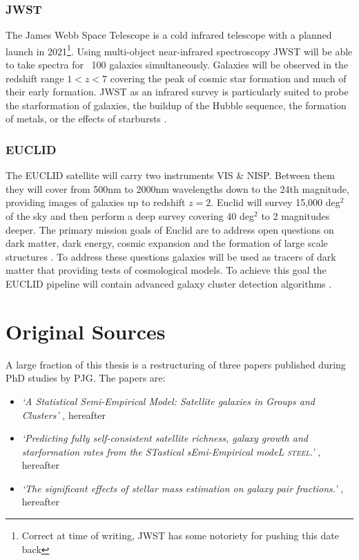 \subsubsection{JWST \cite{JamesNASA}}

The James Webb Space Telescope is a cold infrared telescope with a planned launch in 2021\footnote{Correct at time of writing, JWST has some notoriety for pushing this date back}. Using multi-object near-infrared spectroscopy JWST will be able to take spectra for ~100 galaxies simultaneously. Galaxies will be observed in the redshift range $1 < z < 7$ covering the peak of cosmic star formation and much of their early formation. JWST as an infrared survey is particularly suited to probe the starformation of galaxies, the buildup of the Hubble sequence, the formation of metals, or the effects of starbursts \cite{Windhorst2009JWST2009}.  


\subsubsection{EUCLID}

The EUCLID satellite will carry two instruments VIS \& NISP. Between them they will cover from 500nm to 2000nm wavelengths down to the 24th magnitude, providing images of galaxies up to redshift $z = 2$. Euclid will survey 15,000 deg$^2$ of the sky and then perform a deep survey covering 40 deg$^2$ to 2 magnitudes deeper. The primary mission goals of Euclid are to address open questions on dark matter, dark energy, cosmic expansion and the formation of large scale structures \cite{Amendola2018CosmologySatellite}. To address these questions galaxies will be used as tracers of dark matter that providing tests of cosmological models. To achieve this goal the EUCLID pipeline will contain advanced galaxy cluster detection algorithms \cite{Adam2019EuclidSelection}.


\section{Original Sources}

A large fraction of this thesis is a restructuring of three papers published during PhD studies by PJG. The papers are:
\begin{itemize}
    \item \textit{`A Statistical Semi-Empirical Model: Satellite galaxies in Groups and Clusters'}  \citet{Grylls2019AClusters}, hereafter 
    \item \textit{`Predicting fully self-consistent satellite richness, galaxy growth and starformation rates from the STastical sEmi-Empirical modeL \textsc{steel}.'} \citet{Grylls2020PredictingSTEEL}, hereafter 
    \item \textit{`The significant effects of stellar mass estimation on galaxy pair fractions.'} \citet{Grylls2020TheFractions}, hereafter 
\end{itemize}


